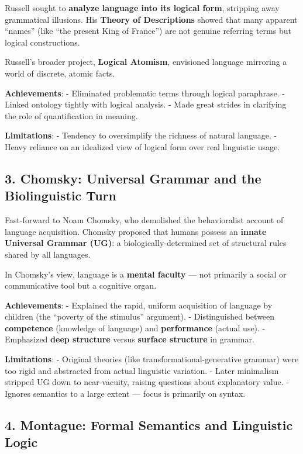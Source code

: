 \documentclass[12pt]{article}
\begin{document}
Russell sought to \textbf{analyze language into its logical form},
stripping away grammatical illusions. His \textbf{Theory of
Descriptions} showed that many apparent ``names'' (like ``the present
King of France'') are not genuine referring terms but logical
constructions.

Russell's broader project, \textbf{Logical Atomism}, envisioned language
mirroring a world of discrete, atomic facts.

\textbf{Achievements}: - Eliminated problematic terms through logical
paraphrase. - Linked ontology tightly with logical analysis. - Made
great strides in clarifying the role of quantification in meaning.

\textbf{Limitations}: - Tendency to oversimplify the richness of natural
language. - Heavy reliance on an idealized view of logical form over
real linguistic usage.

\hypertarget{chomsky-universal-grammar-and-the-biolinguistic-turn}{%
\subsection{3. Chomsky: Universal Grammar and the Biolinguistic
Turn}\label{chomsky-universal-grammar-and-the-biolinguistic-turn}}

Fast-forward to Noam Chomsky, who demolished the behavioralist account
of language acquisition. Chomsky proposed that humans possess an
\textbf{innate Universal Grammar (UG)}: a biologically-determined set of
structural rules shared by all languages.

In Chomsky's view, language is a \textbf{mental faculty} --- not
primarily a social or communicative tool but a cognitive organ.

\textbf{Achievements}: - Explained the rapid, uniform acquisition of
language by children (the ``poverty of the stimulus'' argument). -
Distinguished between \textbf{competence} (knowledge of language) and
\textbf{performance} (actual use). - Emphasized \textbf{deep structure}
versus \textbf{surface structure} in grammar.

\textbf{Limitations}: - Original theories (like
transformational-generative grammar) were too rigid and abstracted from
actual linguistic variation. - Later minimalism stripped UG down to
near-vacuity, raising questions about explanatory value. - Ignores
semantics to a large extent --- focus is primarily on syntax.

\hypertarget{montague-formal-semantics-and-linguistic-logic}{%
\subsection{4. Montague: Formal Semantics and Linguistic
Logic}\label{montague-formal-semantics-and-linguistic-logic}}
\end{document}
